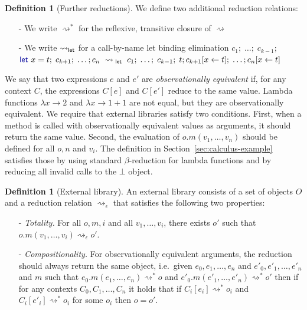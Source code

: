 \documentclass[english,crc]{programming}
\newcounter{dfc}
\theoremstyle{plain}
\theoremstyle{definition}
\newtheorem{definition}[dfc]{Definition}
\newcommand{\ident}[1]{\textnormal{\textcolor{idclr}{\sffamily #1}}}
\newcommand{\kvd}[1]{\textnormal{\textcolor{kvdclr}{\sffamily #1}}}
\begin{document}
\begin{definition}[Further reductions]
\label{def:further-red}
We define two additional reduction relations:
\begin{itemize}
\item[-] We write $\rightsquigarrow^{*}$ for the reflexive, transitive closure of $\rightsquigarrow$
\item[-] We write $\rightsquigarrow_\ident{let}$ for a call-by-name let binding elimination
  $c_1;\; \ldots;\; c_{k-1};\;$\\ $\kvd{let}~x=t;\; c_{k+1};\; \ldots; c_n ~\rightsquigarrow_\ident{let}~
  c_1;\; \ldots;\; c_{k-1};\; t; c_{k+1}[x\leftarrow t];\; \ldots; c_n[x\leftarrow t]$
\end{itemize}
\end{definition}

\noindent
We say that two expressions
$e$ and $e'$ are \emph{observationally equivalent} if, for any context $C$, the expressions $C[e]$ and
$C[e']$ reduce to the same value. Lambda functions $\lambda x\!\rightarrow\!2$ and
$\lambda x\!\rightarrow\!1\!+\!1$ are not equal, but they are observationally equivalent.
We require that external libraries satisfy two conditions. First, when a method is called with
observationally equivalent values as arguments, it should return the same value. Second, the
evaluation of $o.m(v_1,\ldots,v_n)$ should be defined for all $o, n$ and $v_i$.
The definition in Section~\ref{sec:calculus-example} satisfies those by using standard
$\beta$-reduction for lambda functions and by reducing all invalid calls to the $\bot$ object.

\begin{definition}[External library]
\label{def:external}
An external library consists of a set of objects $O$ and a reduction relation
$\rightsquigarrow_\epsilon$ that satisfies the following two properties:
\begin{itemize}
\item[-] \emph{Totality.} For all $o, m, i$ and all $v_1, \ldots, v_i$, there exists $o'$ such
  that $o.m(v_1, \ldots, v_i) \rightsquigarrow_\epsilon o'$.
\item[-] \emph{Compositionality.} For observationally equivalent arguments, the reduction should always return
  the same object, i.e.~given $e_0, e_1, \ldots, e_n$ and $e'_0, e'_1, \ldots, e'_n$ and $m$ such that
  $e_0.m(e_1, \ldots, e_n) \rightsquigarrow^{*} o$ and $e'_0.m(e'_1, \ldots, e'_n) \rightsquigarrow^{*} o'$ then
  if for any contexts $C_0, C_1, \ldots, C_n$ it holds that if $C_i[e_i] \rightsquigarrow^{*} o_i$ and
  $C_i[e'_i] \rightsquigarrow^{*} o_i$ for some $o_i$ then $o = o'$.
\end{itemize}
\end{definition}
\end{document}
